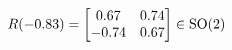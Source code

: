 \documentclass[preview]{standalone}
\begin{document}
\begin{align*}
\special{dvisvgm:raw <g id='unique000'>}R(-0.83) = \begin{bmatrix} 0.67 & 0.74 \\ -0.74 & 0.67 \end{bmatrix} \in \text{SO}(2)\special{dvisvgm:raw </g>}
\end{align*}
\end{document}

